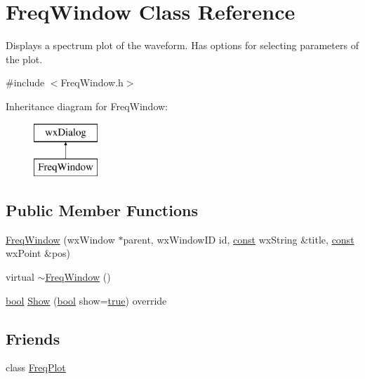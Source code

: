\hypertarget{class_freq_window}{}\section{Freq\+Window Class Reference}
\label{class_freq_window}


Displays a spectrum plot of the waveform. Has options for selecting parameters of the plot.  




{\ttfamily \#include $<$Freq\+Window.\+h$>$}

Inheritance diagram for Freq\+Window\+:\begin{figure}[H]
\begin{center}
\leavevmode
\includegraphics[height=2.000000cm]{class_freq_window}
\end{center}
\end{figure}
\subsection*{Public Member Functions}
\begin{DoxyCompactItemize}
\item 
\hyperlink{class_freq_window_a8491058c99cd09a9eba349664364424d}{Freq\+Window} (wx\+Window $\ast$parent, wx\+Window\+ID id, \hyperlink{getopt1_8c_a2c212835823e3c54a8ab6d95c652660e}{const} wx\+String \&title, \hyperlink{getopt1_8c_a2c212835823e3c54a8ab6d95c652660e}{const} wx\+Point \&pos)
\item 
virtual \hyperlink{class_freq_window_a55a280916d69679fbe64ca78bf75ac1e}{$\sim$\+Freq\+Window} ()
\item 
\hyperlink{mac_2config_2i386_2lib-src_2libsoxr_2soxr-config_8h_abb452686968e48b67397da5f97445f5b}{bool} \hyperlink{class_freq_window_af142f9ed50c13abe4794ca3af8b8c561}{Show} (\hyperlink{mac_2config_2i386_2lib-src_2libsoxr_2soxr-config_8h_abb452686968e48b67397da5f97445f5b}{bool} show=\hyperlink{mac_2config_2i386_2lib-src_2libsoxr_2soxr-config_8h_a41f9c5fb8b08eb5dc3edce4dcb37fee7}{true}) override
\end{DoxyCompactItemize}
\subsection*{Friends}
\begin{DoxyCompactItemize}
\item 
class \hyperlink{class_freq_window_a0a6ef15fec340db897b7b1f65c86e605}{Freq\+Plot}
\end{DoxyCompactItemize}



